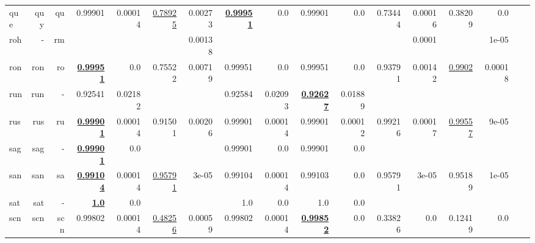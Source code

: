 \documentclass[11pt]{article}
\begin{document}
\begin{table*}[h]
{\begin{tabular}{lrrrrrrrrrrrrrrrr}
que         & quy         & qu         & 0.99901         & 0.00014         & \underline{0.78925}         & 0.00273         & \textbf{\underline{0.99951}}         & 0.0         & 0.99901         & 0.0         & 0.73444         & 0.00016         & 0.38209         & 0.0         \\
roh         & -         & rm         &          &          &          & 0.00138         &          &          &          &          &          & 0.0001         &          & 1e-05         \\
ron         & ron         & ro         & \textbf{\underline{0.99951}}         & 0.0         & 0.75522         & 0.00719         & 0.99951         & 0.0         & 0.99951         & 0.0         & 0.93791         & 0.00142         & \underline{0.9902}         & 0.00018         \\
run         & run         & -         & 0.92541         & 0.02182         &          &          & 0.92584         & 0.02093         & \textbf{\underline{0.92627}}         & 0.01889         &          &          &          &          \\
rus         & rus         & ru         & \textbf{\underline{0.99901}}         & 0.00014         & 0.91501         & 0.00206         & 0.99901         & 0.00014         & 0.99901         & 0.00012         & 0.99216         & 0.00017         & \underline{0.99557}         & 9e-05         \\
sag         & sag         & -         & \textbf{\underline{0.99901}}         & 0.0         &          &          & 0.99901         & 0.0         & 0.99901         & 0.0         &          &          &          &          \\
san         & san         & sa         & \textbf{\underline{0.99104}}         & 0.00014         & \underline{0.95791}         & 3e-05         & 0.99104         & 0.00014         & 0.99103         & 0.0         & 0.95791         & 3e-05         & 0.95189         & 1e-05         \\
sat         & sat         & -         & \textbf{\underline{1.0}}         & 0.0         &          &          & 1.0         & 0.0         & 1.0         & 0.0         &          &          &          &          \\
scn         & scn         & scn         & 0.99802         & 0.00014         & \underline{0.48256}         & 0.00059         & 0.99802         & 0.00014         & \textbf{\underline{0.99852}}         & 0.0         & 0.33826         & 0.0         & 0.12419         & 0.0         \\

\end{tabular}}
\end{table*}
\end{document}
